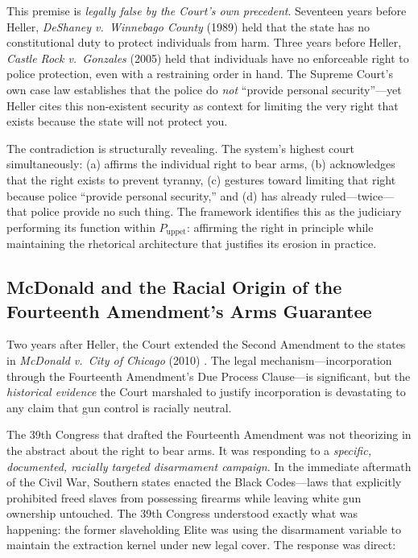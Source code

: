\documentclass[12pt,openany]{book}
\begin{document}
This premise is \textit{legally false by the Court's own precedent}. Seventeen years before Heller, \textit{DeShaney v.\ Winnebago County} (1989) held that the state has no constitutional duty to protect individuals from harm. Three years before Heller, \textit{Castle Rock v.\ Gonzales} (2005) held that individuals have no enforceable right to police protection, even with a restraining order in hand. The Supreme Court's own case law establishes that the police do \textit{not} ``provide personal security''---yet Heller cites this non-existent security as context for limiting the very right that exists because the state will not protect you.

The contradiction is structurally revealing. The system's highest court simultaneously: (a) affirms the individual right to bear arms, (b) acknowledges that the right exists to prevent tyranny, (c) gestures toward limiting that right because police ``provide personal security,'' and (d) has already ruled---twice---that police provide no such thing. The framework identifies this as the judiciary performing its function within $P_{\text{uppet}}$: affirming the right in principle while maintaining the rhetorical architecture that justifies its erosion in practice.

\subsection{McDonald and the Racial Origin of the Fourteenth Amendment's Arms Guarantee}

Two years after Heller, the Court extended the Second Amendment to the states in \textit{McDonald v.\ City of Chicago} (2010) \cite{mcdonald}. The legal mechanism---incorporation through the Fourteenth Amendment's Due Process Clause---is significant, but the \textit{historical evidence} the Court marshaled to justify incorporation is devastating to any claim that gun control is racially neutral.

The 39th Congress that drafted the Fourteenth Amendment was not theorizing in the abstract about the right to bear arms. It was responding to a \textit{specific, documented, racially targeted disarmament campaign}. In the immediate aftermath of the Civil War, Southern states enacted the Black Codes---laws that explicitly prohibited freed slaves from possessing firearms while leaving white gun ownership untouched. The 39th Congress understood exactly what was happening: the former slaveholding Elite was using the disarmament variable to maintain the extraction kernel under new legal cover. The response was direct:
\end{document}
